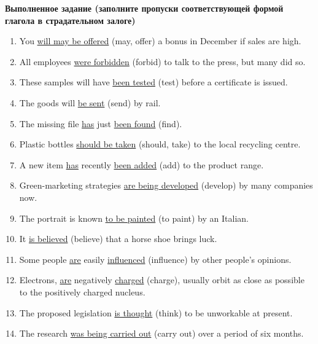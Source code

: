 \documentclass[main.tex]{subfiles}
\begin{document}
\textbf{Выполненное задание (заполните пропуски соответствующей формой глагола в страдательном залоге)}

\begin{enumerate}[nosep]
	\item You \underline{will may be offered} (may, offer) a bonus in December if sales are high.
	\item All employees \underline{were forbidden} (forbid) to talk to the press, but many did so.
	\item These samples will have \underline{been tested} (test) before a certificate is issued.
	\item The goods will \underline{be sent} (send) by rail.
	\item The missing file \underline{has} just \underline{been found} (find).
	\item Plastic bottles \underline{should be taken} (should, take) to the local recycling centre.
	\item A new item \underline{has} recently \underline{been added} (add) to the product range.
	\item Green-marketing strategies \underline{are being developed} (develop) by many companies now.
	\item The portrait is known \underline{to be painted} (to paint) by an Italian.
	\item It \underline{is believed} (believe) that a horse shoe brings luck.
	\item Some people \underline{are} easily \underline{influenced} (influence) by other people's opinions.
	\item Electrons, \underline{are} negatively \underline{charged} (charge), usually orbit as close as possible to the positively charged nucleus.
	\item The proposed legislation \underline{is thought} (think) to be unworkable at present.
	\item The research \underline{was being carried out} (carry out) over a period of six months.
\end{enumerate}
\end{document}
